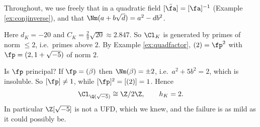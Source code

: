 Throughout, we use freely that in a quadratic field $[\bar\fa] = [\fa]^{-1}$ (Example \ref{ex:conjinverse}), and that $\Nm(a+b\sqrt d) = a^2-db^2$.

\begin{example}[$K = \Q(\sqrt{-5})$]\label{ex:cl5}
	Here $d_K = -20$ and $C_K = \tfrac2\pi\sqrt{20} \approx 2.847$. So $\Cl_K$ is generated by primes of norm $\le 2$, i.e.\ primes above $2$. By Example \ref{ex:quadfactor}, $(2) = \fp^2$ with $\fp = (2,1+\sqrt{-5})$ of norm $2$.

	Is $\fp$ principal? If $\fp = (\beta)$ then $\Nm(\beta) = \pm2$, i.e.\ $a^2+5b^2 = 2$, which is insoluble. So $[\fp]\neq1$, while $[\fp]^2 = [(2)] = 1$. Hence
	$$\Cl_{\Q(\sqrt{-5})} \cong \Z/2\Z, \qquad h_K = 2.$$
	In particular $\Z[\sqrt{-5}]$ is not a UFD, which we knew, and the failure is as mild as it could possibly be.
\end{example}

